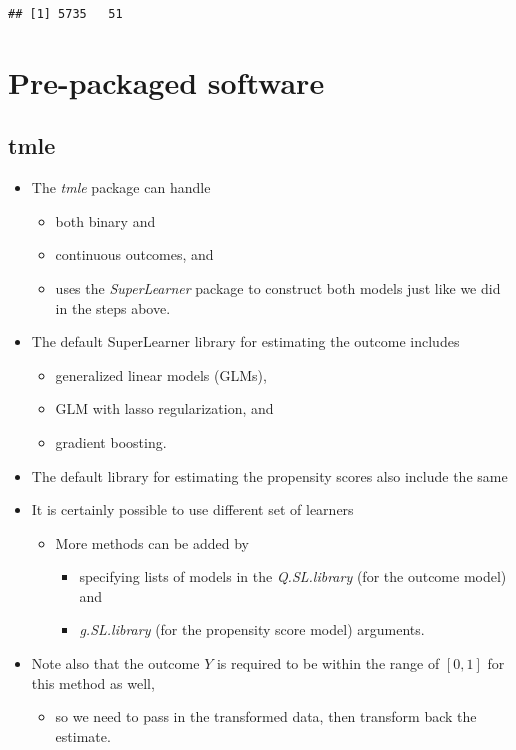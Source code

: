 \documentclass[
]{book}
\providecommand{\tightlist}{%
  \setlength{\itemsep}{0pt}\setlength{\parskip}{0pt}}
\begin{document}
\begin{verbatim}
## [1] 5735   51
\end{verbatim}

\hypertarget{pre-packaged-software}{%
\chapter{Pre-packaged software}\label{pre-packaged-software}}

\hypertarget{tmle-2}{%
\section{tmle}\label{tmle-2}}

\begin{itemize}
\tightlist
\item
  The \emph{tmle} package can handle

  \begin{itemize}
  \tightlist
  \item
    both binary and
  \item
    continuous outcomes, and
  \item
    uses the \emph{SuperLearner} package to construct both models just like we did in the steps above.
  \end{itemize}
\item
  The default SuperLearner library for estimating the outcome includes \citep{tmlePkgDocs}

  \begin{itemize}
  \tightlist
  \item
    generalized linear models (GLMs),
  \item
    GLM with lasso regularization, and
  \item
    gradient boosting.
  \end{itemize}
\item
  The default library for estimating the propensity scores also include the same
\item
  It is certainly possible to use different set of learners

  \begin{itemize}
  \tightlist
  \item
    More methods can be added by

    \begin{itemize}
    \tightlist
    \item
      specifying lists of models in the \emph{Q.SL.library} (for the outcome model) and
    \item
      \emph{g.SL.library} (for the propensity score model) arguments.
    \end{itemize}
  \end{itemize}
\item
  Note also that the outcome \(Y\) is required to be within the range of \([0,1]\) for this method as well,

  \begin{itemize}
  \tightlist
  \item
    so we need to pass in the transformed data, then transform back the estimate.
  \end{itemize}
\end{itemize}
\end{document}
